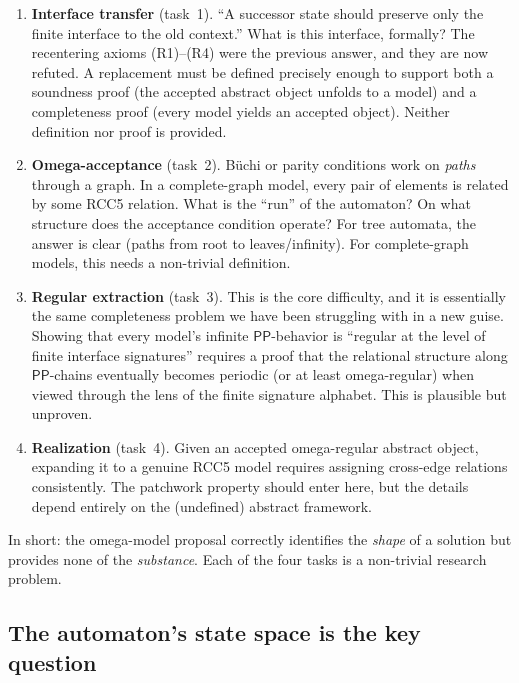 \documentclass[11pt]{article}
\newcommand{\Pp}{\mathsf{PP}}
\begin{document}
\begin{enumerate}
\item \textbf{Interface transfer} (task~1).\;
  ``A successor state should preserve only the finite interface to
  the old context.''  What is this interface, formally?  The
  recentering axioms (R1)--(R4) were the previous answer, and they
  are now refuted.  A replacement must be defined precisely enough
  to support both a soundness proof (the accepted abstract object
  unfolds to a model) and a completeness proof (every model yields
  an accepted object).  Neither definition nor proof is provided.

\item \textbf{Omega-acceptance} (task~2).\;
  B\"uchi or parity conditions work on \emph{paths} through a
  graph.  In a complete-graph model, every pair of elements is
  related by some RCC5 relation.  What is the ``run'' of the
  automaton?  On what structure does the acceptance condition
  operate?  For tree automata, the answer is clear (paths from root
  to leaves\slash infinity).  For complete-graph models, this needs
  a non-trivial definition.

\item \textbf{Regular extraction} (task~3).\;
  This is the core difficulty, and it is essentially the same
  completeness problem we have been struggling with in a new guise.
  Showing that every model's infinite $\Pp$-behavior is ``regular
  at the level of finite interface signatures'' requires a proof
  that the relational structure along $\Pp$-chains eventually
  becomes periodic (or at least omega-regular) when viewed through
  the lens of the finite signature alphabet.  This is plausible
  but unproven.

\item \textbf{Realization} (task~4).\;
  Given an accepted omega-regular abstract object, expanding it to a
  genuine RCC5 model requires assigning cross-edge relations
  consistently.  The patchwork property should enter here, but the
  details depend entirely on the (undefined) abstract framework.
\end{enumerate}

In short: the omega-model proposal correctly identifies the
\emph{shape} of a solution but provides none of the \emph{substance}.
Each of the four tasks is a non-trivial research problem.

\subsection{The automaton's state space is the key question}
\end{document}
